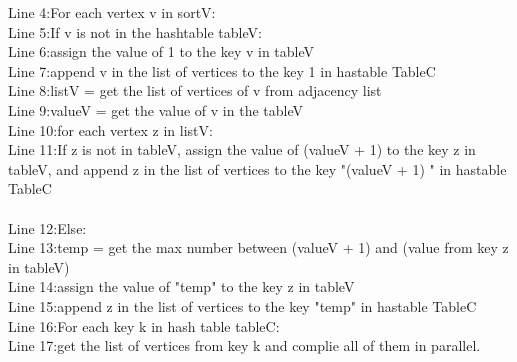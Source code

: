 \documentclass[11pt]{article}
\newcommand{\tab}{\hspace*{2em}}
\begin{document}
Line 4:\tab For each vertex v in sortV:\\
Line 5:\tab\tab If v is not in the hashtable tableV:\\
Line 6:\tab\tab\tab assign the value of 1 to the key v in tableV\\
Line 7:\tab\tab\tab append v in the list of vertices to the key 1 in hastable TableC\\
Line 8:\tab\tab listV = get the list of vertices of v from adjacency list\\
Line 9:\tab\tab valueV = get the value of v in the tableV\\
Line 10:\tab\tab for each vertex z in listV:\\
Line 11:\tab\tab\tab If z is not in tableV, assign the value of (valueV + 1) to the key z in tableV, and append z in the list of vertices to the key "(valueV + 1) " in hastable TableC\\\\
Line 12:\tab\tab\tab Else: \\
Line 13:\tab\tab\tab\tab temp = get the max number between (valueV + 1) and (value from key z in tableV)\\
Line 14:\tab\tab\tab\tab assign the value of "temp" to the key z in tableV\\
Line 15:\tab\tab\tab\tab append z in the list of vertices to the key "temp" in hastable TableC\\
Line 16:\tab For each key k in hash table tableC:\\
Line 17:\tab\tab get the list of vertices from key k and complie all of them in parallel.\\
\end{document}
